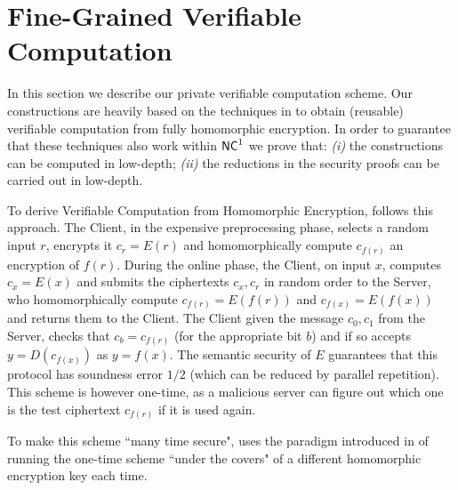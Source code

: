 \section{Fine-Grained Verifiable Computation}
\label{sec:vc}
\label{sec:VC}


In this section we describe our private verifiable computation scheme.
Our constructions are heavily based on the techniques in \cite{ckv10} to obtain (reusable) verifiable computation from fully homomorphic encryption.
In order to guarantee that these techniques also work within ${\mathsf{NC}}^1$  we prove that: \textit{(i)} the constructions can be computed in low-depth; \textit{(ii)} the reductions in the security proofs can be carried out in low-depth.

\medskip
{}
To derive Verifiable Computation from Homomorphic Encryption, \cite{ckv10} follows this approach. The Client, in the expensive preprocessing phase, selects a random input $r$, encrypts it $c_r=E(r)$ and homomorphically compute $c_{f(r)}$ an encryption of $f(r)$. During the online phase, the Client, on input $x$, computes $c_x=E(x)$ and submits
the ciphertexts $c_x,c_r$ in random order to the Server, who homomorphically compute 
$c_{f(r)}=E(f(r))$ and $c_{f(x)}=E(f(x))$ and returns them to the Client. The Client given the message $c_0,c_1$ from the Server, checks that $c_b=c_{f(r)}$ (for the appropriate bit $b$) and if so accepts $y=D(c_{f(x)})$ as $y=f(x)$. The semantic security of $E$ guarantees that this protocol has soundness error $1/2$ (which can be reduced by parallel repetition). This scheme is however one-time, as a malicious server can figure out 
which one is the test ciphertext $c_{f(r)}$ if it is used again. 

To make this scheme ``many time secure", \cite{ckv10} uses the paradigm introduced in 
\cite{ggp10} of running the one-time scheme ``under the covers" of a different
homomorphic encryption key each time. 



